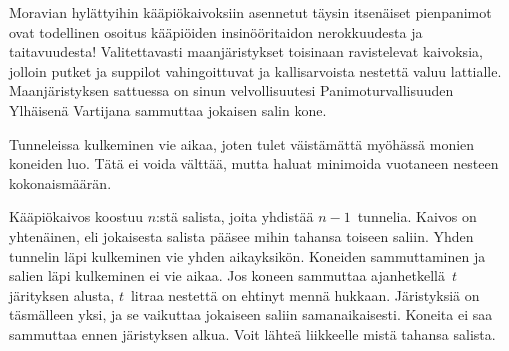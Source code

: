 

\noindent
Moravian hylättyihin kääpiökaivoksiin asennetut täysin itsenäiset pienpanimot ovat todellinen osoitus kääpiöiden insinööritaidon nerokkuudesta ja taitavuudesta!
Valitettavasti maanjäristykset toisinaan ravistelevat kaivoksia, jolloin putket ja suppilot vahingoittuvat ja kallisarvoista nestettä valuu lattialle.
Maanjäristyksen sattuessa on sinun velvollisuutesi Panimoturvallisuuden Ylhäisenä Vartijana sammuttaa jokaisen salin kone.


Tunneleissa kulkeminen vie aikaa,
joten tulet väistämättä myöhässä monien koneiden luo.
Tätä ei voida välttää, mutta haluat minimoida vuotaneen nesteen kokonaismäärän.

\medskip
Kääpiökaivos koostuu $n$:stä salista, joita yhdistää $n-1$~tunnelia.
Kaivos on yhtenäinen, eli jokaisesta salista pääsee mihin tahansa toiseen saliin.
Yhden tunnelin läpi kulkeminen vie yhden aikayksikön.
Koneiden sammuttaminen ja salien läpi kulkeminen ei vie aikaa.
Jos koneen sammuttaa ajanhetkellä~$t$ järityksen alusta, $t$~litraa nestettä on ehtinyt mennä hukkaan.
Järistyksiä on täsmälleen yksi, ja se vaikuttaa jokaiseen saliin samanaikaisesti. Koneita ei saa sammuttaa ennen järistyksen alkua.
Voit lähteä liikkeelle mistä tahansa salista.

